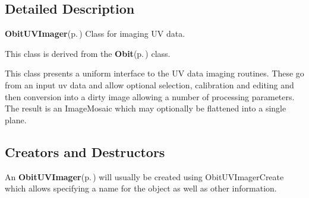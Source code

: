 \subsection{Detailed Description}
{\bf Obit\-UVImager}{\rm (p.\,\pageref{structObitUVImager})} Class for imaging UV data. 

This class is derived from the {\bf Obit}{\rm (p.\,\pageref{structObit})} class.

This class presents a uniform interface to the UV data imaging routines. These go from an input uv data and allow optional selection, calibration and editing and then conversion into a dirty image allowing a number of processing parameters. The result is an Image\-Mosaic which may optionally be flattened into a single plane.\subsection{Creators and Destructors}\label{ObitUVImager_8h_ObitUVImageraccess}
An {\bf Obit\-UVImager}{\rm (p.\,\pageref{structObitUVImager})} will usually be created using Obit\-UVImager\-Create which allows specifying a name for the object as well as other information.

